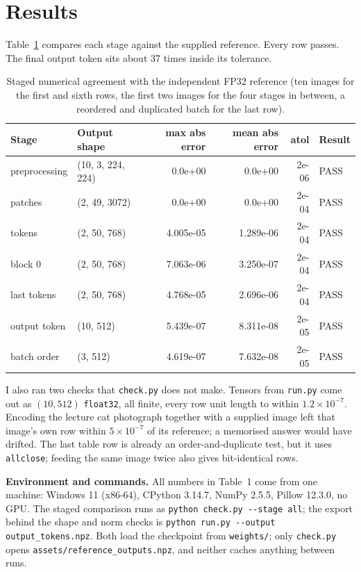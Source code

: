\documentclass[a4paper,12pt]{article}
\begin{document}
\section{Results}

Table~\ref{tab:errors} compares each stage against the supplied reference. Every
row passes. The final output token sits about 37 times inside its
tolerance.

\begin{table}[H]
\centering
\small
\caption{Staged numerical agreement with the independent FP32 reference
(ten images for the first and sixth rows, the first two images for the four
stages in between, a reordered and duplicated batch for the last row).}
\label{tab:errors}
\begin{tabular}{llrrrl}
\hline
Stage & Output shape & max abs error & mean abs error & atol & Result \\
\hline
preprocessing & (10, 3, 224, 224) & 0.0e+00 & 0.0e+00 & 2e-06 & PASS \\
patches       & (2, 49, 3072)      & 0.0e+00 & 0.0e+00 & 2e-04 & PASS \\
tokens        & (2, 50, 768)       & 4.005e-05 & 1.289e-06 & 2e-04 & PASS \\
block 0       & (2, 50, 768)       & 7.063e-06 & 3.250e-07 & 2e-04 & PASS \\
last tokens   & (2, 50, 768)       & 4.768e-05 & 2.696e-06 & 2e-04 & PASS \\
output token  & (10, 512)          & 5.439e-07 & 8.311e-08 & 2e-05 & PASS \\
batch order   & (3, 512)           & 4.619e-07 & 7.632e-08 & 2e-05 & PASS \\
\hline
\end{tabular}
\end{table}

I also ran two checks that \texttt{check.py} does not make. Tensors from
\texttt{run.py} come out as $(10,512)$ \texttt{float32}, all finite, every row
unit length to within $1.2\times10^{-7}$. Encoding the lecture cat photograph
together with a supplied image left that image's own row within
$5\times10^{-7}$ of its reference; a memorised answer would have drifted. The
last table row is already an order-and-duplicate test, but it uses
\texttt{allclose}; feeding the same image twice also gives bit-identical rows.

\noindent\textbf{Environment and commands.} All numbers in Table~1 come from one
machine: Windows 11 (x86-64), CPython 3.14.7, NumPy 2.5.5, Pillow 12.3.0, no
GPU. The staged comparison runs as \texttt{python check.py -{}-stage all}; the
export behind the shape and norm checks is
\texttt{python run.py -{}-output output\_tokens.npz}. Both load the checkpoint from
\texttt{weights/}; only \texttt{check.py} opens
\texttt{assets/reference\_outputs.npz}, and neither caches anything between
runs.
\end{document}

